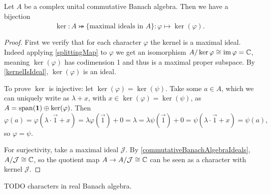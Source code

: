 \begin{proposition} \label{characterMaximalIdealsComplex}
Let $A$ be a complex unital commutative Banach algebra. Then we have a bijection
\[ \ker: \hat{A} \twoheadrightarrowtail \{\text{maximal ideals in $A$}\}: \varphi \mapsto \ker(\varphi).  \]
\end{proposition}
\begin{proof}
First we verify that for each character $\varphi$ the kernel is a maximal ideal. Indeed applying \ref{splittingMap} to $\varphi$ we get an isomorphism $A/\ker\varphi \cong \operatorname{im}\varphi = \mathbb{C}$, meaning $\ker(\varphi)$ has codimension 1 and thus is a maximal proper subspace. By \ref{kernelIsIdeal}, $\ker(\varphi)$ is an ideal.

To prove $\ker$ is injective: let $\ker(\varphi) = \ker(\psi)$. Take some $a\in A$, which we can uniquely write as $\lambda+x$, with $x\in\ker(\varphi) = \ker(\psi)$, as $A = \operatorname{span}(\boldsymbol{\mathrm{1}})\oplus \ker(\varphi)$. Then
\[ \varphi(a) = \varphi(\lambda\cdot\vec{1} + x) = \lambda\varphi(\vec{1}) + 0 = \lambda = \lambda\psi(\vec{1}) + 0 = \psi(\lambda\cdot\vec{1} + x) = \psi(a), \]
so $\varphi = \psi$.

For surjectivity, take a maximal ideal $\mathcal{J}$.
By \ref{commutativeBanachAlgebraIdeals}, $A/\mathcal{J}\cong \mathbb{C}$, so the quotient map $A\to A/\mathcal{J}\cong \mathbb{C}$ can be seen as a character with kernel $\mathcal{J}$.
\end{proof}

TODO characters in real Banach algebra.


